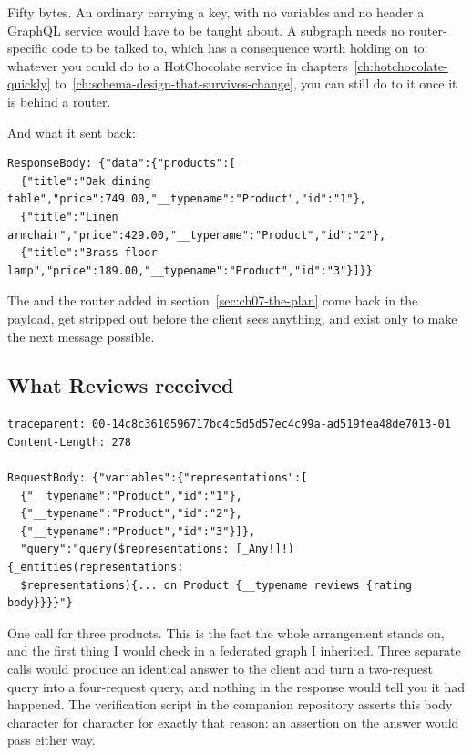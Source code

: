 Fifty bytes. An ordinary  carrying a  key, with no
variables and no header a GraphQL service would have to be taught about. A
subgraph needs no router-specific code to be talked to, which has a consequence
worth holding on to: whatever you could do to a HotChocolate service in
chapters~\ref{ch:hotchocolate-quickly}
to~\ref{ch:schema-design-that-survives-change}, you can still do to it once it
is behind a router.

And what it sent back:

\begin{verbatim}
ResponseBody: {"data":{"products":[
  {"title":"Oak dining table","price":749.00,"__typename":"Product","id":"1"},
  {"title":"Linen armchair","price":429.00,"__typename":"Product","id":"2"},
  {"title":"Brass floor lamp","price":189.00,"__typename":"Product","id":"3"}]}}
\end{verbatim}

The  and  the router added in
section~\ref{sec:ch07-the-plan} come back in the payload, get stripped out
before the client sees anything, and exist only to make the next message
possible.

\subsection*{What Reviews received}

\begin{verbatim}
traceparent: 00-14c8c3610596717bc4c5d5d57ec4c99a-ad519fea48de7013-01
Content-Length: 278

RequestBody: {"variables":{"representations":[
  {"__typename":"Product","id":"1"},
  {"__typename":"Product","id":"2"},
  {"__typename":"Product","id":"3"}]},
  "query":"query($representations: [_Any!]!){_entities(representations:
  $representations){... on Product {__typename reviews {rating body}}}}"}
\end{verbatim}

%
One call for three products. This is the fact the whole arrangement stands on,
and the first thing I would check in a federated graph I inherited. Three
separate calls would produce an identical answer to the client and turn a
two-request query into a four-request query, and nothing in the response would
tell you it had happened. The verification script in the companion repository
asserts this body character for character for exactly that reason: an assertion
on the answer would pass either way.

